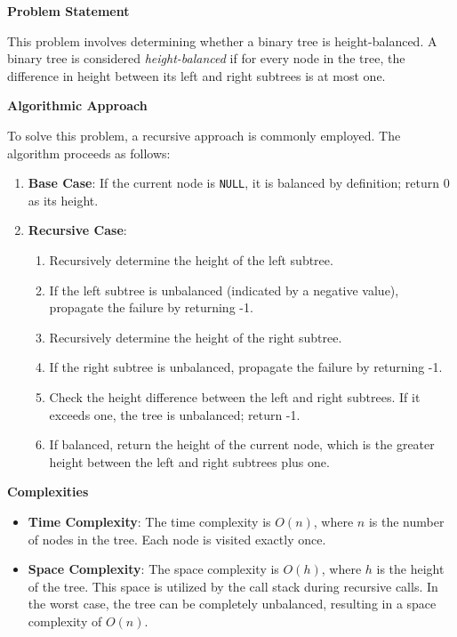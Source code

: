 

\textbf{Problem Statement}

This problem involves determining whether a binary tree is height-balanced. A binary tree is considered \textit{height-balanced} if for every node in the tree, the difference in height between its left and right subtrees is at most one.

\textbf{Algorithmic Approach}

To solve this problem, a recursive approach is commonly employed. The algorithm proceeds as follows:

\begin{enumerate}
    \item \textbf{Base Case}: If the current node is \texttt{NULL}, it is balanced by definition; return 0 as its height.
    \item \textbf{Recursive Case}: 
    \begin{enumerate}
        \item Recursively determine the height of the left subtree.
        \item If the left subtree is unbalanced (indicated by a negative value), propagate the failure by returning -1.
        \item Recursively determine the height of the right subtree.
        \item If the right subtree is unbalanced, propagate the failure by returning -1.
        \item Check the height difference between the left and right subtrees. If it exceeds one, the tree is unbalanced; return -1.
        \item If balanced, return the height of the current node, which is the greater height between the left and right subtrees plus one.
    \end{enumerate}
\end{enumerate}

\textbf{Complexities}

\begin{itemize}
    \item \textbf{Time Complexity}: The time complexity is \(O(n)\), where \(n\) is the number of nodes in the tree. Each node is visited exactly once.
    \item \textbf{Space Complexity}: The space complexity is \(O(h)\), where \(h\) is the height of the tree. This space is utilized by the call stack during recursive calls. In the worst case, the tree can be completely unbalanced, resulting in a space complexity of \(O(n)\).
\end{itemize}

